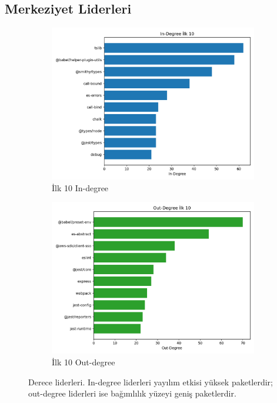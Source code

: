 \documentclass[11pt,a4paper]{article}
\begin{document}
\subsection{Merkeziyet Liderleri}
\begin{figure}[H]
  \centering
  \begin{subfigure}[t]{0.48\textwidth}
    \centering
    \includegraphics{top10_in_degree.png}
    \caption{İlk 10 In-degree}
  \end{subfigure}\hfill
  \begin{subfigure}[t]{0.48\textwidth}
    \centering
    \includegraphics{top10_out_degree.png}
    \caption{İlk 10 Out-degree}
  \end{subfigure}
  \caption{Derece liderleri. In-degree liderleri yayılım etkisi yüksek paketlerdir; out-degree liderleri ise bağımlılık yüzeyi geniş paketlerdir.}
\end{figure}
\end{document}
